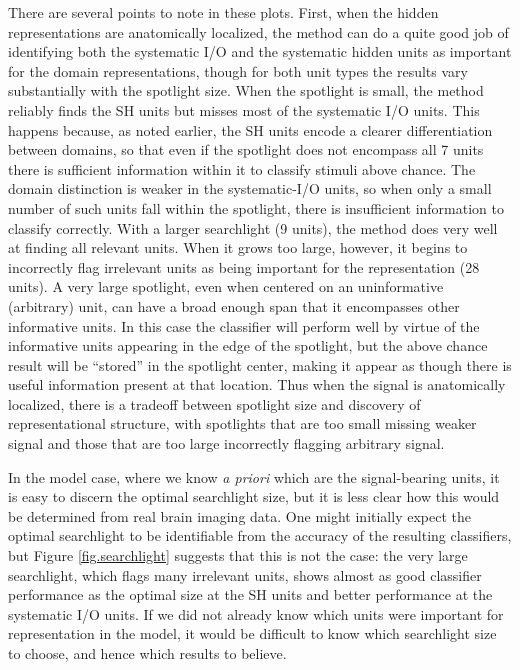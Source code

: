 There are several points to note in these plots. First, when the hidden representations are anatomically localized, the method can do a quite good job of identifying both the systematic I/O and the systematic hidden units as important for the domain representations, though for both unit types the results vary substantially with the spotlight size. When the spotlight is small, the method reliably finds the SH units but misses most of the systematic I/O units. This happens because, as noted earlier, the SH units encode a clearer differentiation between domains, so that even if the spotlight does not encompass all 7 units there is sufficient information within it to classify stimuli above chance. The domain distinction is weaker in the systematic-I/O units, so when only a small number of such units fall within the spotlight, there is insufficient information to classify correctly. With a larger searchlight (9 units), the method does very well at finding all relevant units.  When it grows too large, however, it begins to incorrectly flag irrelevant units as being important for the representation (28 units). A very large spotlight, even when centered on an uninformative (arbitrary) unit, can have a broad enough span that it encompasses other informative units. In this case the classifier will perform well by virtue of the informative units appearing in the edge of the spotlight, but the above chance result will be ``stored'' in the spotlight center, making it appear as though there is useful information present at that location. Thus when the signal is anatomically localized, there is a tradeoff between spotlight size and discovery of representational structure, with spotlights that are too small missing weaker signal and those that are too large incorrectly flagging arbitrary signal.

In the model case, where we know {\it a priori} which are the signal-bearing units, it is easy to discern the optimal searchlight size, but it is less clear how this would be determined from real brain imaging data. One might initially expect the optimal searchlight to be identifiable from the accuracy of the resulting classifiers, but Figure \ref{fig.searchlight} suggests that this is not the case: the very large searchlight, which flags many irrelevant units, shows almost as good classifier performance as the optimal size at the SH units and better performance at the systematic I/O units. If we did not already know which units were important for representation in the model, it would be difficult to know which searchlight size to choose, and hence which results to believe.


